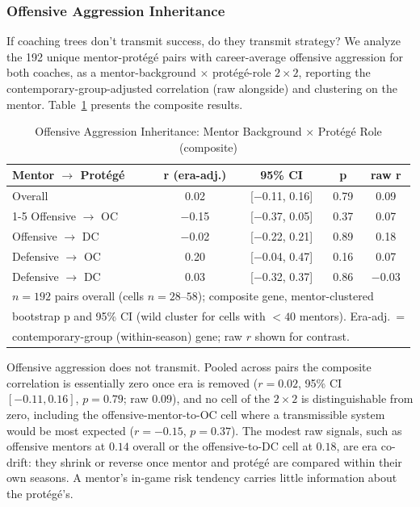 \documentclass[USenglish]{article}
\theoremstyle{dgthm}
\theoremstyle{dgdef}
\begin{document}
\subsubsection{Offensive Aggression Inheritance}

If coaching trees don't transmit success, do they transmit strategy? We analyze the 192 unique mentor-prot\'{e}g\'{e} pairs with career-average offensive aggression for both coaches, as a mentor-background $\times$ prot\'{e}g\'{e}-role $2\times2$, reporting the contemporary-group-adjusted correlation (raw alongside) and clustering on the mentor. Table~\ref{tab:inheritance} presents the composite results.

\begin{table}[H]
\caption{Offensive Aggression Inheritance: Mentor Background $\times$ Prot\'{e}g\'{e} Role (composite)}
\label{tab:inheritance}
\begin{tabular}{lcccc}
\toprule
\textbf{Mentor $\rightarrow$ Prot\'{e}g\'{e}} & \textbf{r (era-adj.)} & \textbf{95\% CI} & \textbf{p} & \textbf{raw r} \\
\midrule
Overall & 0.02 & [$-$0.11, 0.16] & 0.79 & 0.09 \\
\cmidrule{1-5}
Offensive $\rightarrow$ OC & $-$0.15 & [$-$0.37, 0.05] & 0.37 & 0.07 \\
Offensive $\rightarrow$ DC & $-$0.02 & [$-$0.22, 0.21] & 0.89 & 0.18 \\
Defensive $\rightarrow$ OC & 0.20 & [$-$0.04, 0.47] & 0.16 & 0.07 \\
Defensive $\rightarrow$ DC & 0.03 & [$-$0.32, 0.37] & 0.86 & $-$0.03 \\
\midrule
\multicolumn{5}{l}{\small $n=192$ pairs overall (cells $n=28$--$58$); composite gene, mentor-clustered}\\
\multicolumn{5}{l}{\small bootstrap p and 95\% CI (wild cluster for cells with $<40$ mentors). Era-adj.\ =}\\
\multicolumn{5}{l}{\small contemporary-group (within-season) gene; raw $r$ shown for contrast.}\\
\bottomrule
\end{tabular}
\end{table}

Offensive aggression does not transmit. Pooled across pairs the composite correlation is essentially zero once era is removed ($r=0.02$, 95\% CI $[-0.11, 0.16]$, $p=0.79$; raw $0.09$), and no cell of the $2\times2$ is distinguishable from zero, including the offensive-mentor-to-OC cell where a transmissible system would be most expected ($r=-0.15$, $p=0.37$). The modest raw signals, such as offensive mentors at $0.14$ overall or the offensive-to-DC cell at $0.18$, are era co-drift: they shrink or reverse once mentor and prot\'{e}g\'{e} are compared within their own seasons. A mentor's in-game risk tendency carries little information about the prot\'{e}g\'{e}'s.
\end{document}

